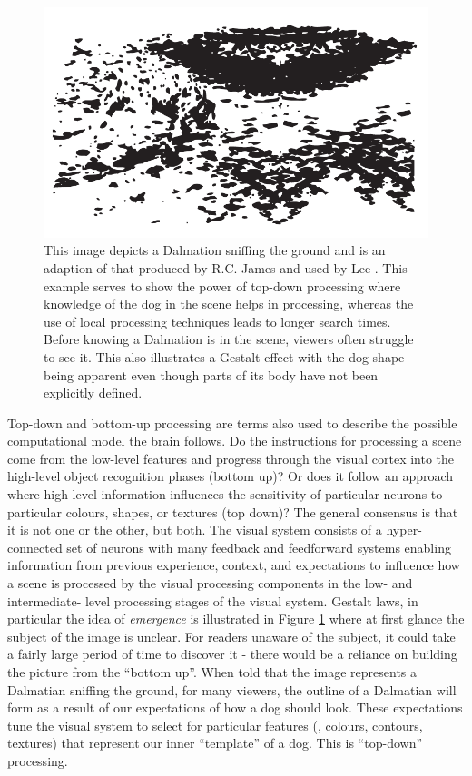 \begin{figure}[h!]
\centering
\includegraphics[scale=.55]{images/related-work/top-down-penguin.pdf}
\caption{This image depicts a Dalmation sniffing the ground and is an adaption of that produced by R.C. James and used by Lee \cite{lee2003computations}.
This example serves to show the power of top-down processing where knowledge of the dog in the scene helps in processing, whereas the use of local processing techniques leads to longer search times.
Before knowing a Dalmation is in the scene, viewers often struggle to see it.
This also illustrates a Gestalt effect with the dog shape being apparent even though parts of its body have not been explicitly defined.}
\label{fig:global-dalmation}
\end{figure}

Top-down and bottom-up processing are terms also used to describe the possible computational model the brain follows. 
Do the instructions for processing a scene come from the low-level features and progress through the visual cortex into the high-level object recognition phases (bottom up)? 
Or does it follow an approach where high-level information influences the sensitivity of particular neurons to particular colours, shapes, or textures (top down)? 
The general consensus is that it is not one or the other, but both. 
The visual system consists of a hyper-connected set of neurons with many feedback and feedforward systems enabling information from previous experience, context, and expectations to influence how a scene is processed by the visual processing components in the low- and intermediate- level processing stages of the visual system. 
Gestalt laws, in particular the idea of \emph{emergence} is illustrated in Figure \ref{fig:global-dalmation} where at first glance the subject of the image is unclear. 
For readers unaware of the subject, it could take a fairly large period of time to discover it - there would be a reliance on building the picture from the ``bottom up''. 
When told that the image represents a Dalmatian sniffing the ground, for many viewers, the outline of a Dalmatian will form as a result of our expectations of how a dog should look. 
These expectations tune the visual system to select for particular features (\eg, colours, contours, textures) that represent our inner ``template'' of a dog.
This is ``top-down'' processing.

